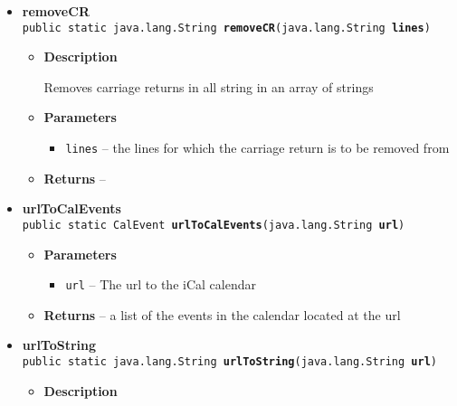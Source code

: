 \documentclass[11pt,a4paper]{report}
\begin{document}
{{{\begin{itemize}
{\begin{itemize}
{Takes a string containing an iCal calendar and returns a list of the events in the calendar
}
\item{
{\bf  Parameters}
  \begin{itemize}
   \item{
\texttt{calendar} -- A string of an iCal calendar}
  \end{itemize}
}%
\item{{\bf  Returns} -- 
a list of the events in the calendar cal 
}%
\end{itemize}
}%
\item{ 
{\bf  removeCR}\\
\texttt{public static java.lang.String\lbrack \rbrack \ {\bf  removeCR}(\texttt{java.lang.String\lbrack \rbrack } {\bf  lines})
\label{is.mpg.ruglan.data.iCalParser.removeCR(java.lang.String[])}}%
\begin{itemize}
\item{
{\bf  Description}

Removes carriage returns in all string in an array of strings
}
\item{
{\bf  Parameters}
  \begin{itemize}
   \item{
\texttt{lines} -- the lines for which the carriage return is to be removed from}
  \end{itemize}
}%
\item{{\bf  Returns} -- 
 
}%
\end{itemize}
}%
\item{ 
{\bf  urlToCalEvents}\\
\texttt{public static CalEvent\lbrack \rbrack \ {\bf  urlToCalEvents}(\texttt{java.lang.String} {\bf  url})
\label{is.mpg.ruglan.data.iCalParser.urlToCalEvents(java.lang.String)}}%
\begin{itemize}
\item{
{\bf  Parameters}
  \begin{itemize}
   \item{
\texttt{url} -- The url to the iCal calendar}
  \end{itemize}
}%
\item{{\bf  Returns} -- 
a list of the events in the calendar located at the url 
}%
\end{itemize}
}%
\item{ 
{\bf  urlToString}\\
\texttt{public static java.lang.String\ {\bf  urlToString}(\texttt{java.lang.String} {\bf  url})
\label{is.mpg.ruglan.data.iCalParser.urlToString(java.lang.String)}}%
\begin{itemize}
\item{
{\bf  Description}

}
\end{itemize}}
\end{itemize}}}}
\end{document}

